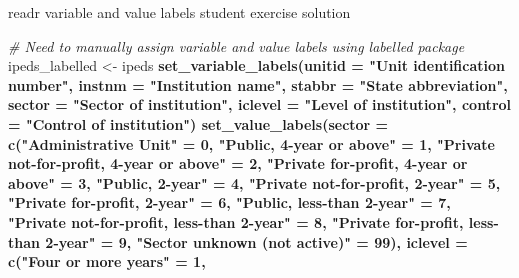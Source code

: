 \documentclass[8pt,ignorenonframetext,dvipsnames]{beamer}
\newenvironment{Shaded}{\begin{snugshade}}{\end{snugshade}}
\newcommand{\KeywordTok}[1]{\textcolor[rgb]{0.13,0.29,0.53}{\textbf{#1}}}
\newcommand{\DataTypeTok}[1]{\textcolor[rgb]{0.13,0.29,0.53}{#1}}
\newcommand{\DecValTok}[1]{\textcolor[rgb]{0.00,0.00,0.81}{#1}}
\newcommand{\StringTok}[1]{\textcolor[rgb]{0.31,0.60,0.02}{#1}}
\newcommand{\CommentTok}[1]{\textcolor[rgb]{0.56,0.35,0.01}{\textit{#1}}}
\newcommand{\OperatorTok}[1]{\textcolor[rgb]{0.81,0.36,0.00}{\textbf{#1}}}
\newcommand{\NormalTok}[1]{#1}
\renewcommand{\textbf}[1]{{\color{darkgray}\bfseries\fontfamily{Montserrat-TOsF}#1}}
\begin{document}
\begin{frame}[fragile]{readr variable and value labels student exercise
solution}

\begin{Shaded}
\begin{Highlighting}[]
\CommentTok{# Need to manually assign variable and value labels using labelled package }
\NormalTok{ipeds_labelled <-}\StringTok{ }\NormalTok{ipeds }\OperatorTok{%
\StringTok{  }\KeywordTok{set_variable_labels}\NormalTok{(}\DataTypeTok{unitid =} \StringTok{"Unit identification number"}\NormalTok{, }
                      \DataTypeTok{instnm =} \StringTok{"Institution name"}\NormalTok{, }
                      \DataTypeTok{stabbr =} \StringTok{"State abbreviation"}\NormalTok{,}
                      \DataTypeTok{sector =} \StringTok{"Sector of institution"}\NormalTok{,}
                      \DataTypeTok{iclevel =} \StringTok{"Level of institution"}\NormalTok{,}
                      \DataTypeTok{control =} \StringTok{"Control of institution"}\NormalTok{) }\OperatorTok{%
\StringTok{  }\KeywordTok{set_value_labels}\NormalTok{(}\DataTypeTok{sector =} \KeywordTok{c}\NormalTok{(}\StringTok{"Administrative Unit"}\NormalTok{ =}\StringTok{ }\DecValTok{0}\NormalTok{, }
                              \StringTok{"Public, 4-year or above"}\NormalTok{ =}\StringTok{ }\DecValTok{1}\NormalTok{, }
                              \StringTok{"Private not-for-profit, 4-year or above"}\NormalTok{ =}\StringTok{ }\DecValTok{2}\NormalTok{,}
                              \StringTok{"Private for-profit, 4-year or above"}\NormalTok{ =}\StringTok{ }\DecValTok{3}\NormalTok{, }
                              \StringTok{"Public, 2-year"}\NormalTok{ =}\StringTok{ }\DecValTok{4}\NormalTok{, }
                              \StringTok{"Private not-for-profit, 2-year"}\NormalTok{ =}\StringTok{ }\DecValTok{5}\NormalTok{, }
                              \StringTok{"Private for-profit, 2-year"}\NormalTok{ =}\StringTok{ }\DecValTok{6}\NormalTok{,}
                              \StringTok{"Public, less-than 2-year"}\NormalTok{ =}\StringTok{ }\DecValTok{7}\NormalTok{, }
                              \StringTok{"Private not-for-profit, less-than 2-year"}\NormalTok{ =}\StringTok{ }\DecValTok{8}\NormalTok{,}
                              \StringTok{"Private for-profit, less-than 2-year"}\NormalTok{ =}\StringTok{ }\DecValTok{9}\NormalTok{, }
                              \StringTok{"Sector unknown (not active)"}\NormalTok{ =}\StringTok{ }\DecValTok{99}\NormalTok{), }
                   \DataTypeTok{iclevel =} \KeywordTok{c}\NormalTok{(}\StringTok{"Four or more years"}\NormalTok{ =}\StringTok{ }\DecValTok{1}\NormalTok{, }
}}
\end{Highlighting}
\end{Shaded}
\end{frame}
\end{document}
